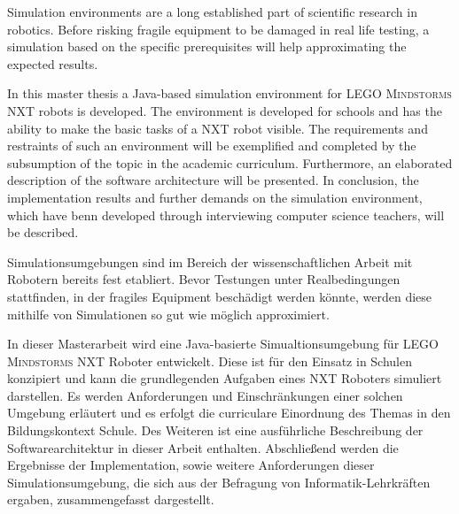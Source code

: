 \documentclass[paper=a4, DIV=calc, BCOR=12mm, twoside=on, onecolumn=on, open = right, titlepage =on, parskip =half-, headsepline = on, footsepline = off, chapterprefix = off, appendixprefix = on, fontsize = 12pt, numbers = noenddot, abstract = on]{scrbook}
\begin{document}
\newpage
\thispagestyle{plain}




\thispagestyle{empty}
\newpage
\thispagestyle{empty}

\onehalfspacing
Simulation environments are a long established part of scientific research in robotics. Before risking fragile equipment to be damaged in real life testing, a simulation based on the specific prerequisites will help approximating the expected results.

In this master thesis a Java-based simulation environment for \textsc{LEGO Mindstorms} NXT robots is developed. The environment is developed for schools and has the ability to make the basic tasks of a NXT robot visible. The requirements and restraints of such an environment will be exemplified and completed by the subsumption of the topic in the academic curriculum. Furthermore, an elaborated description of the software architecture will be presented. In conclusion, the implementation results and further demands on the simulation environment, which have benn developed through interviewing computer science teachers, will be described.

\onehalfspacing
Simulationsumgebungen sind im Bereich der wissenschaftlichen Arbeit mit Robotern bereits fest etabliert. Bevor Testungen unter Realbedingungen stattfinden, in der fragiles Equipment beschädigt werden könnte, werden diese mithilfe von Simulationen so gut wie möglich approximiert.

In dieser Masterarbeit wird eine Java-basierte Simualtionsumgebung für \textsc{LEGO Mindstorms} NXT Roboter entwickelt. Diese ist für den Einsatz in Schulen konzipiert und kann die grundlegenden Aufgaben eines NXT Roboters simuliert darstellen. Es werden Anforderungen und Einschränkungen einer solchen Umgebung erläutert und es erfolgt die curriculare Einordnung des Themas in den Bildungskontext Schule. Des Weiteren ist eine ausführliche Beschreibung der Softwarearchitektur in dieser Arbeit enthalten. Abschließend werden die Ergebnisse der Implementation, sowie weitere Anforderungen dieser Simulationsumgebung, die sich aus der Befragung von Informatik-Lehrkräften ergaben, zusammengefasst dargestellt.

\singlespacing
\newpage
\listoffigures
\newpage
\tableofcontents
\thispagestyle{empty}
\cleardoublepage
\newpage
{}
\par \singlespacing
\end{document}

